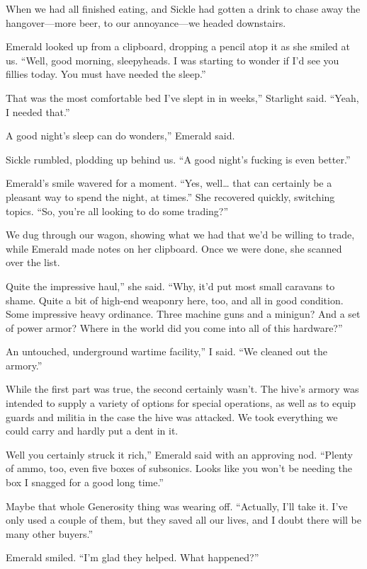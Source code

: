 When we had all finished eating, and Sickle had gotten a drink to chase away the hangover—more beer, to our annoyance—we headed downstairs.

Emerald looked up from a clipboard, dropping a pencil atop it as she smiled at us. “Well, good morning, sleepyheads. I was starting to wonder if I’d see you fillies today. You must have needed the sleep.”

\leavevmode{}That was the most comfortable bed I’ve slept in in weeks,” Starlight said. “Yeah, I needed that.”

\leavevmode{}A good night’s sleep can do wonders,” Emerald said.

Sickle rumbled, plodding up behind us. “A good night’s fucking is even better.”

Emerald’s smile wavered for a moment. “Yes, well… that can certainly be a pleasant way to spend the night, at times.” She recovered quickly, switching topics. “So, you’re all looking to do some trading?”

We dug through our wagon, showing what we had that we’d be willing to trade, while Emerald made notes on her clipboard. Once we were done, she scanned over the list.

\leavevmode{}Quite the impressive haul,” she said. “Why, it’d put most small caravans to shame. Quite a bit of high-end weaponry here, too, and all in good condition. Some impressive heavy ordinance. Three machine guns and a minigun? And a set of power armor? Where in the world did you come into all of this hardware?”

\leavevmode{}An untouched, underground wartime facility,” I said. “We cleaned out the armory.”

While the first part was true, the second certainly wasn’t. The hive’s armory was intended to supply a variety of options for special operations, as well as to equip guards and militia in the case the hive was attacked. We took everything we could carry and hardly put a dent in it.

\leavevmode{}Well you certainly struck it rich,” Emerald said with an approving nod. “Plenty of ammo, too, even five boxes of subsonics. Looks like you won’t be needing the box I snagged for a good long time.”

Maybe that whole Generosity thing was wearing off. “Actually, I’ll take it. I’ve only used a couple of them, but they saved all our lives, and I doubt there will be many other buyers.”

Emerald smiled. “I’m glad they helped. What happened?”

